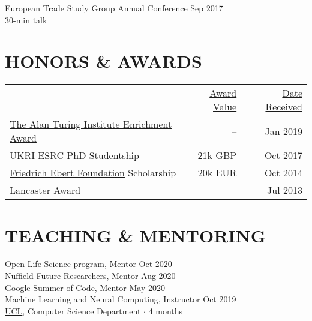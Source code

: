 \documentclass{cv}
\newcommand{\printbibsection}[2]{
\begin{refsection}
\nocite{*}
\printbibliography[sorting=chronological,
                  type={#1},
                  title={#2},
                  heading=none]
\end{refsection}
}
\begin{document}
European Trade Study Group Annual Conference \hfill Sep 2017 \\
{\color{lightgray} 30-min talk} \\

\section{HONORS \& AWARDS}

\noindent
\begin{tabularx}{\textwidth}{@{}lrr}
& \underline{Award Value} & \underline{Date Received} \\
\href{https://www.turing.ac.uk/work-turing/studentships/enrichment}{The Alan Turing Institute Enrichment Award} & -- & Jan 2019 \\
\href{https://esrc.ukri.org}{UKRI ESRC} PhD Studentship & 21k GBP & Oct 2017 \\
\href{https://www.fes.de}{Friedrich Ebert Foundation} Scholarship & 20k EUR & Oct 2014 \\
Lancaster Award & -- & Jul 2013 \\
\end{tabularx}




\section{TEACHING \& MENTORING}

\href{https://openlifesci.org}{Open Life Science program}, Mentor \hfill Oct 2020 \\

\href{https://www.nuffieldfoundation.org/students-teachers/nuffield-future-researchers}{Nuffield Future Researchers}, Mentor \hfill Aug 2020 \\

\href{https://summerofcode.withgoogle.com/archive/2020/projects/6262209727954944/}{Google Summer of Code}, Mentor \hfill May 2020 \\

Machine Learning and Neural Computing, Instructor \hfill Oct 2019 \\
{\color{lightgray} \href{https://www.ucl.ac.uk/}{UCL}, Computer Science Department $\cdot$ 4 months} \\
\end{document}
